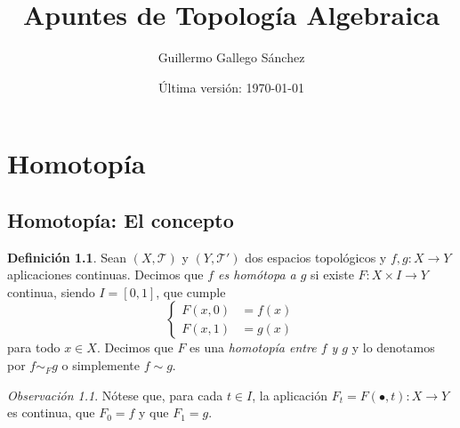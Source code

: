 \documentclass[12pt,a4paper]{book}
\title{Apuntes de Topología Algebraica}
\author{Guillermo Gallego Sánchez}
\date{Última versión: \today}
\theoremstyle{definition} \newtheorem{defn}[thm]{Definición}
\theoremstyle{definition} \newtheorem{ejemplo}[thm]{Ejemplo}
\theoremstyle{definition} \newtheorem{ejercicio}[thm]{Ejercicio}
\theoremstyle{remark} \newtheorem*{obs}{Observación}
\def\TT{\mathcal{T}}
\begin{document}
\maketitle
\tableofcontents
\chapter{Homotopía}
\section{Homotopía: El concepto}
\begin{defn}
  Sean $(X,\TT)$ y $(Y,\TT')$ dos espacios topológicos y $f,g:X\rightarrow Y$ aplicaciones continuas. Decimos que \emph{$f$ es homótopa a $g$} si existe $F:X\times I \rightarrow Y$ continua, siendo $I=[0,1]$, que cumple
  \begin{equation*}
  \begin{cases}
    F(x,0)&=f(x) \\
    F(x,1)&=g(x) 
  \end{cases}
\end{equation*}
para todo $x \in X$. Decimos que $F$ es una \emph{homotopía entre $f$ y $g$} y lo denotamos por  $f\sim_F g$ o simplemente $f\sim g$.
    
\end{defn}

\begin{obs}
  Nótese que, para cada $t\in I$, la aplicación $F_t=F(\bullet,t):X\rightarrow Y$ es continua, que $F_0= f$ y que $F_1 = g$.
\end{obs}
\end{document}
